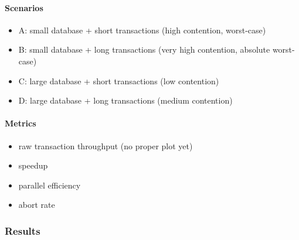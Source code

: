\paragraph{Scenarios}

\begin{itemize}
    \item A: small database + short transactions (high contention, worst-case)
    \item B: small database + long transactions (very high contention, absolute worst-case)
    \item C: large database + short transactions (low contention)
    \item D: large database + long transactions (medium contention)
\end{itemize}

\paragraph{Metrics}

\begin{itemize}
    \item raw transaction throughput (no proper plot yet)
    \item speedup
    \item parallel efficiency
    \item abort rate
\end{itemize}

\subsubsection{Results}


